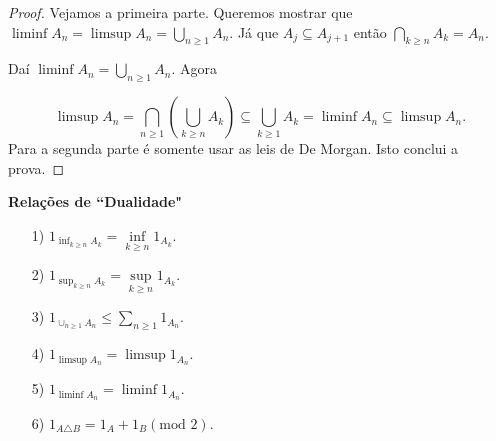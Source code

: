 \begin{proof}
Vejamos a primeira parte. Queremos mostrar que 
$\liminf A_n = \limsup A_n =\displaystyle\bigcup_{n\geqslant 1} {A_n}$. Já que $A_j \subseteq A_{j+1}$
então $\displaystyle\bigcap_{k\geqslant n} {A_k}=A_n$.

Daí $\liminf A_n = \displaystyle\bigcup_{n\geqslant 1} {A_n}$. Agora 

$$
	\limsup A_n 
	=
	\displaystyle\bigcap_{n\geqslant 1} \left(\displaystyle\bigcup_{k\geqslant n}{A_k} \right)
	\subseteq 
	\displaystyle\bigcup_{k\geqslant 1} {A_k} 
	=
	\liminf A_n \subseteq \limsup A_n.
$$
Para a segunda parte é somente usar as leis de De Morgan. Isto conclui a prova.
\end{proof}

\vspace*{1cm}
\textbf{Relações de ``Dualidade"}
\begin{enumerate}
\item[1)] $1_{\inf_{k\geqslant n} A_k} = \inf \limits_{k\geqslant n} 1_{A_k}$.
\item[2)] $1_{\sup_{k\geqslant n} A_k} = \sup \limits_{k\geqslant n} 1_{A_k}$.
\item[3)] $1_{\cup_{n\geqslant 1} A_n} \leqslant \sum \limits_{n \geqslant 1} 1_{A_n}$.
\item[4)] $1_{\limsup A_n} = \limsup 1_{A_n}$.
\item[5)] $1_{\liminf A_n} = \liminf 1_{A_n}$.
\item[6)] $ 1_{A \triangle B} = 1_A + 1_B (\text{mod 2})$.
\end{enumerate}
